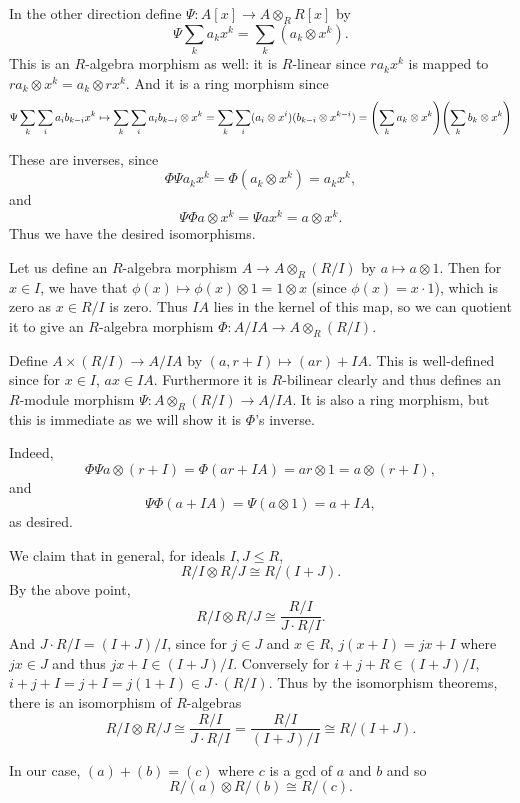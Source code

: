     In the other direction define $\Psi\colon A[x]\to A\otimes_RR[x]$ by
    $$ \Psi\sum_ka_kx^k = \sum_k(a_k\otimes x^k) . $$
    This is an $R$-algebra morphism as well: it is $R$-linear since $ra_kx^k$ is mapped to $ra_k\otimes x^k=a_k\otimes rx^k$.
    And it is a ring morphism since
    $$ \Psi\sum_k\sum_i a_ib_{k-i}x^k \mapsto \sum_k\sum_i a_ib_{k-i}\otimes x^k = 
    \sum_k\sum_i(a_i\otimes x^i)(b_{k-i}\otimes x^{k-i}) = \mathopen{}\mathclose{\left(\sum_k a_k\otimes x^k\right)}\mathopen{}\mathclose{\left(\sum_k b_k\otimes x^k\right)} $$

    These are inverses, since
    $$ \Phi\Psi a_kx^k = \Phi(a_k\otimes x^k) = a_kx^k , $$
    and
    $$ \Psi\Phi a\otimes x^k = \Psi ax^k = a\otimes x^k . $$
    Thus we have the desired isomorphisms.

    \item Let us define an $R$-algebra morphism $A\to A\otimes_R(R/I)$ by $a\mapsto a\otimes 1$.
    Then for $x\in I$, we have that $\phi(x)\mapsto\phi(x)\otimes 1=1\otimes x$ (since $\phi(x)=x\cdot1$), which is zero as $x\in R/I$ is zero.
    Thus $IA$ lies in the kernel of this map, so we can quotient it to give an $R$-algebra morphism $\Phi\colon A/IA\to A\otimes_R(R/I)$.

    Define $A\times(R/I)\to A/IA$ by $(a,r+I)\mapsto(ar)+IA$.
    This is well-defined since for $x\in I$, $ax\in IA$.
    Furthermore it is $R$-bilinear clearly and thus defines an $R$-module morphism $\Psi\colon A\otimes_R(R/I)\to A/IA$.
    It is also a ring morphism, but this is immediate as we will show it is $\Phi$'s inverse.

    Indeed,
    $$ \Phi\Psi a\otimes(r+I) = \Phi (ar+IA) = ar\otimes1 = a\otimes(r+I) , $$
    and
    $$ \Psi\Phi(a+IA) = \Psi(a\otimes1) = a+IA , $$
    as desired.

    \item We claim that in general, for ideals $I,J\leq R$,
    $$ R/I \otimes R/J \cong R/(I+J) . $$
    By the above point,
    $$ R/I \otimes R/J \cong \frac{R/I}{J\cdot R/I} . $$
    And $J\cdot R/I=(I+J)/I$, since for $j\in J$ and $x\in R$, $j(x+I)=jx+I$ where $jx\in J$ and thus $jx+I\in(I+J)/I$.
    Conversely for $i+j+R\in(I+J)/I$, $i+j+I=j+I=j(1+I)\in J\cdot(R/I)$.
    Thus by the isomorphism theorems, there is an isomorphism of $R$-algebras
    $$ R/I \otimes R/J \cong \frac{R/I}{J\cdot R/I} = \frac{R/I}{(I+J)/I} \cong R/(I+J). $$

    In our case, $(a)+(b)=(c)$ where $c$ is a gcd of $a$ and $b$ and so
    $$ R/(a) \otimes R/(b) \cong R/(c) . $$

